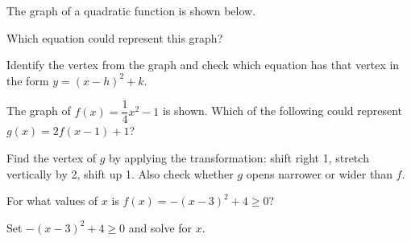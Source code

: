 \documentclass{ximera}
\begin{document}
\begin{problem}
The graph of a quadratic function is shown below.

\begin{center}
\end{center}

Which equation could represent this graph?
\begin{hint}
Identify the vertex from the graph and check which equation has that vertex in the form $y = (x-h)^2 + k$.
\end{hint}
\begin{multipleChoice}
\end{multipleChoice}
\end{problem}

\begin{problem}
The graph of $f(x) = \dfrac{1}{4}x^2 - 1$ is shown. Which of the following could represent $g(x) = 2f(x-1)+1$?
\begin{hint}
Find the vertex of $g$ by applying the transformation: shift right 1, stretch vertically by 2, shift up 1. Also check whether $g$ opens narrower or wider than $f$.
\end{hint}
\begin{multipleChoice}
\end{multipleChoice}
\end{problem}

\begin{problem}
For what values of $x$ is $f(x) = -(x-3)^2 + 4 \geq 0$?
\begin{hint}
Set $-(x-3)^2+4 \geq 0$ and solve for $x$.
\end{hint}
\begin{multipleChoice}
  \choice{$[0,6]$}
  \choice[correct]{$[1,5]$}
  \choice{$[2,4]$}
  \choice{$[1,4]$}
\end{multipleChoice}
\end{problem}
\end{document}
